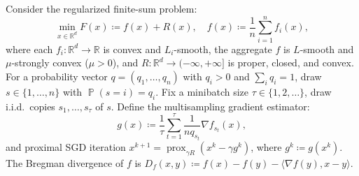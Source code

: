 \documentclass[11pt,a4paper]{article}
\DeclareMathOperator{\Pbb}{\mathbb{P}}
\DeclareMathOperator{\prox}{prox}
\begin{document}
Consider the regularized finite-sum problem:
\[
\min_{x \in \mathbb{R}^d} F(x) \coloneqq f(x) + R(x), \quad f(x) \coloneqq \frac{1}{n} \sum_{i=1}^n f_i(x),
\]
where each $f_i : \mathbb{R}^d \to \mathbb{R}$ is convex and $L_i$-smooth, the aggregate $f$ is $L$-smooth and $\mu$-strongly convex ($\mu > 0$), and $R : \mathbb{R}^d \to (-\infty, +\infty]$ is proper, closed, and convex. For a probability vector $q = (q_1, \dots, q_n)$ with $q_i > 0$ and $\sum_i q_i = 1$, draw $s \in \{1, \dots, n\}$ with $\Pbb(s = i) = q_i$. Fix a minibatch size $\tau \in \{1, 2, \dots\}$, draw i.i.d.\ copies $s_1, \dots, s_\tau$ of $s$. Define the multisampling gradient estimator:
\[
g(x) \coloneqq \frac{1}{\tau} \sum_{t=1}^\tau \frac{1}{n q_{s_t}} \nabla f_{s_t}(x),
\]
and proximal SGD iteration $x^{k+1} = \prox_{\gamma R}(x^k - \gamma g^k)$, where $g^k \coloneqq g(x^k)$.
The Bregman divergence of $f$ is $D_f(x, y) \coloneqq f(x) - f(y) - \langle \nabla f(y), x - y \rangle$.
\end{document}
